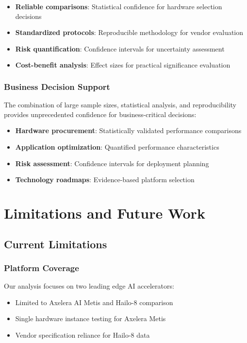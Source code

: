 \documentclass[manuscript]{acmart}
\begin{document}
\begin{itemize}
    \item \textbf{Reliable comparisons}: Statistical confidence for hardware selection decisions
    \item \textbf{Standardized protocols}: Reproducible methodology for vendor evaluation
    \item \textbf{Risk quantification}: Confidence intervals for uncertainty assessment
    \item \textbf{Cost-benefit analysis}: Effect sizes for practical significance evaluation
\end{itemize}

\subsubsection{Business Decision Support}
The combination of large sample sizes, statistical analysis, and reproducibility provides unprecedented confidence for business-critical decisions:

\begin{itemize}
    \item \textbf{Hardware procurement}: Statistically validated performance comparisons
    \item \textbf{Application optimization}: Quantified performance characteristics
    \item \textbf{Risk assessment}: Confidence intervals for deployment planning
    \item \textbf{Technology roadmaps}: Evidence-based platform selection
\end{itemize}

\section{Limitations and Future Work}

\subsection{Current Limitations}

\subsubsection{Platform Coverage}
Our analysis focuses on two leading edge AI accelerators:
\begin{itemize}
    \item Limited to Axelera AI Metis and Hailo-8 comparison
    \item Single hardware instance testing for Axelera Metis
    \item Vendor specification reliance for Hailo-8 data
\end{itemize}
\end{document}
